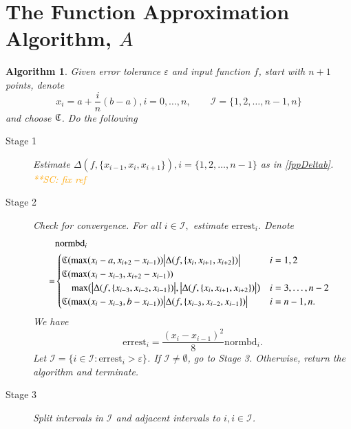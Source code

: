 \documentclass[review]{elsarticle}
\newtheorem{algo}{Algorithm}
\newcommand{\scnote}[1]{ {\textcolor{orange}  {\mbox{**SC:} #1}}}
\begin{document}
\section{The Function Approximation Algorithm, $A$} \label{sec:fappx}

\begin{algo}
Given error tolerance $\varepsilon$ and input function $f$, start with $n+1$ points, denote
$$x_i=a+\frac{i}{n}(b-a), i=0,\ldots,n, \qquad \mathcal{I} = \{1,2,\ldots,n-1,n\}$$ and choose $\mathfrak{C}$. Do the following
\begin{description}
\item[Stage 1] \label{stage1} Estimate $\Delta(f,\{x_{i-1}, x_{i}, x_{i+1}\}), i = \{1,2,\ldots,n-1\}$ as in \eqref{fppDeltab}. \scnote{fix ref}
\item[Stage 2] \label{stage2} Check for convergence.
For all $ i \in \mathcal{I},$ estimate $\text{errest}_i.$
Denote
\begin{align*}
    & \text{normbd}_i 
\\ \hspace{-2ex} 
= &
\begin{cases}
\fC(\max(x_i-a,x_{i+2}-x_{i-1}))\bigabs{\Delta(f,\{x_{i}, x_{i+1}, x_{i+2}\})}        &  i=1,2 \\
\fC(\max(x_i-x_{i-3},x_{i+2}-x_{i-1})) \\ \quad \max\bigl(\bigabs{\Delta(f,\{x_{i-3}, x_{i-2}, x_{i-1}\})},\bigabs{\Delta(f,\{x_{i}, x_{i+1}, x_{i+2}\})}\bigr) & i =3, \ldots, n-2\\
\fC(\max(x_i-x_{i-3},b-x_{i-1}))\bigabs{\Delta(f,\{x_{i-3}, x_{i-2}, x_{i-1}\})}  & i=n-1,n.\\
\end{cases}
\end{align*}
We have
\[
\text{errest}_i=
\frac{(x_i-x_{i-1})^2}{8}\text{normbd}_i.
\]
Let $ \mathcal{I} = \{i \in \mathcal{I}: \text{errest}_i > \varepsilon\}$.
If $\mathcal{I} \ne \emptyset$, go to Stage 3.
Otherwise, return the algorithm and terminate.
\item[Stage 3] \label{stage3}  Split intervals in $\mathcal{I}$ and adjacent intervals to $i, i \in \mathcal{I}$. %

\end{description}
\end{algo}
\end{document}
